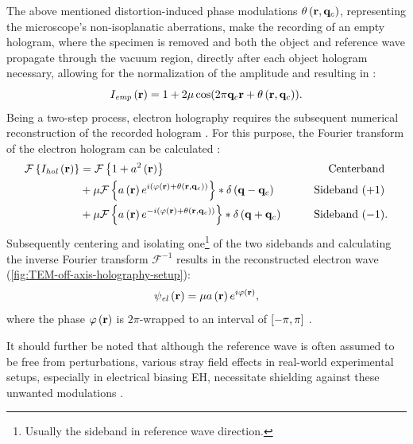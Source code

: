 The above mentioned distortion-induced phase modulations $\theta\left(\vb{r}, \vb{q}_c\right)$, representing the microscope's non-isoplanatic aberrations, make the recording of an empty hologram, where the specimen is removed and both the object and reference wave propagate through the vacuum region, directly after each object hologram necessary, allowing for the normalization of the amplitude and resulting in \cite{Voelkl1999,Lehmann2002,Lichte2008}:
\begin{equation}
  I_{\mathit{emp}}\left(\vb{r}\right) = 1 + 2\mu \cos(2\pi \vb{q}_c \vb{r} + \theta\left(\vb{r}, \vb{q}_c\right)).
\end{equation}
Being a two-step process, electron holography requires the subsequent numerical reconstruction of the recorded hologram \cite{Voelkl1999,Lehmann2002,Lichte2008}. For this purpose, the Fourier transform of the electron hologram can be calculated \cite{Lehmann1994,Voelkl1995,Voelkl1999,Lehmann2002,Lichte2008}:
	\begin{alignat}{3}
		\mathcal{F}\left\{ I_{\mathit{hol}}\left(\vb{r}\right) \right\} &= \mathcal{F}\left\{ 1 + a^2\left(\vb{r}\right) \right\} &\qquad\text{Centerband}& \notag \\
		&+ \mu \mathcal{F}\left\{ a\left(\vb{r}\right)e^{i\left(\varphi\left(\vb{r}\right) + \theta\left(\vb{r},\vb{q}_c\right)\right)} \right\} * \delta\left(\vb{q} - \vb{q}_c\right) &\quad\text{Sideband $\left(+1\right)$}& \notag \\
		&+ \mu \mathcal{F}\left\{ a\left(\vb{r}\right)e^{-i\left(\varphi\left(\vb{r}\right) + \theta\left(\vb{r},\vb{q}_c\right)\right)}\right\} * \delta\left(\vb{q} + \vb{q}_c\right) &\qquad\text{Sideband $\left(-1\right)$}&.
	\end{alignat}
Subsequently centering and isolating one\footnote{Usually the sideband in reference wave direction.} of the two sidebands and calculating the inverse Fourier transform $\mathcal{F}^{-1}$ results in the reconstructed electron wave (\cref{fig:TEM-off-axis-holography-setup}):
\begin{equation}
	{\psi}_{\mathit{el}}\left(\vb{r}\right) = \mu a\left(\vb{r}\right)e^{i\varphi\left(\vb{r}\right)},
\end{equation}
where the phase $\varphi\left(\vb{r}\right)$ is $2\pi$-wrapped to an interval of $\interval{-\pi}{\pi}$ \cite{Lehmann1994,Voelkl1995,Voelkl1999,Lehmann2002,Lichte2008}.

It should further be noted that although the reference wave is often assumed to be free from perturbations, various stray field effects in real-world experimental setups, especially in electrical biasing EH, necessitate shielding against these unwanted modulations \cite{Wagner2019,Wagner2022}.

